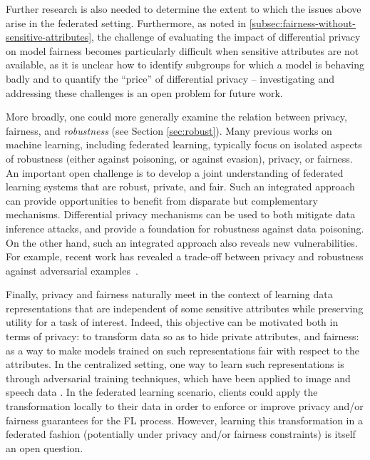 \documentclass[11pt]{article}
\begin{document}
Further research is also needed to determine the extent to which the issues above arise in the federated setting. Furthermore, as noted in \cref{subsec:fairness-without-sensitive-attributes}, the challenge of evaluating the impact of differential privacy on model fairness becomes particularly difficult when sensitive attributes are not available, as it is unclear how to identify subgroups for which a model is behaving badly and to quantify the ``price'' of differential privacy -- investigating and addressing these challenges is an open problem for future work.

More broadly, one could more generally examine the relation between privacy, fairness, and \emph{robustness} (see Section \ref{sec:robust}). Many previous works on machine learning, including federated learning, typically focus on isolated aspects of robustness (either against poisoning, or against evasion), privacy, or fairness. An important open challenge is to develop a joint understanding of federated learning systems that are robust, private, and fair. Such an integrated approach can provide opportunities to benefit from disparate but complementary mechanisms. Differential privacy mechanisms can be used to both mitigate data inference attacks, and provide a foundation for robustness against data poisoning. On the other hand, such an integrated approach also reveals new vulnerabilities. For example, recent work has revealed a trade-off between privacy and robustness against adversarial examples~\cite{song:ccs19}.


Finally, privacy and fairness naturally meet in the context of
learning data representations that are independent of some sensitive attributes while preserving
utility for a task of interest. Indeed, this objective can be motivated
both in terms of privacy: to transform data so as to hide private
attributes, and fairness: as a way to make models trained on such representations
fair with respect to the attributes.
In the centralized setting, one way to learn such representations is through
adversarial training techniques, which have been applied to image and speech
data \citep{kairouz20learning,DBLP:journals/corr/abs-1802-09386,Madras2018,Bertran2019,Srivastava2019a}. In
the federated learning scenario, clients could apply the
transformation locally to their data in order to enforce or improve privacy and/or fairness guarantees for the FL process. However, learning this transformation in a federated fashion (potentially under privacy and/or fairness constraints) is itself an open question.
\end{document}
